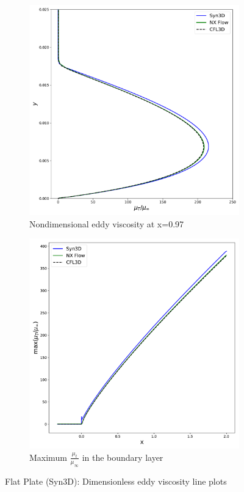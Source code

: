 \begin{figure}[ht!]
\centering
\begin{subfigure}{.45\textwidth}
  \centering
  \includegraphics[width=1.0\textwidth]{figs/flat/mut_x097.pdf}
  \caption{Nondimensional eddy viscosity at x=0.97 }
\end{subfigure}%
\begin{subfigure}{.45\textwidth}
  \centering
  \includegraphics[width=1.0\textwidth]{figs/flat/maxmut.pdf}
  \caption{Maximum $\frac{\mu_t}{\mu_{\infty}}$ in the boundary layer}
  \label{fig:synflatmutmax}
\end{subfigure}
\caption{Flat Plate (Syn3D): Dimensionless eddy viscosity line plots}
\label{fig:synflatmu}
\end{figure}

